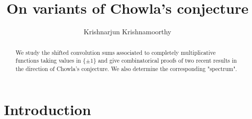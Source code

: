 \documentclass[12pt, a4paper]{amsart}
\theoremstyle{remark}
\theoremstyle{proof}
\numberwithin{equation}{section}
\numberwithin{assumption}{section}
\begin{document}
	
	\title{On variants of Chowla's conjecture}
	
	\author{Krishnarjun Krishnamoorthy}
	\address{Beijing Institute of Mathemtical Sciences and Applications (BIMSA), No. 544, Hefangkou Village, Huaibei Town, Huairou District, Beijing.}

	
	
	
	\begin{abstract}
		We study the shifted convolution sums associated to completely multiplicative functions taking values in $\{\pm 1\}$ and give combinatorical proofs of two recent results in the direction of Chowla's conjecture. We also determine the corresponding "spectrum".
	\end{abstract}
	
	\maketitle
	
	\section{Introduction}\label{Section "Introduction"}
	
\end{document}
